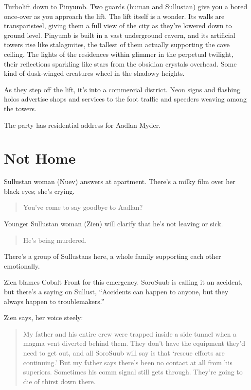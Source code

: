 \documentclass{book}
\begin{document}
\begin{multicols}{2}
Turbolift down to Pinyumb. Two guards (human and Sullustan) give you a bored once-over as you approach the lift. The lift itself is a wonder. Its walls are transparisteel, giving them a full view of the city as they’re lowered down to ground level. Pinyumb is built in a vast underground cavern, and its artificial towers rise like stalagmites, the tallest of them actually supporting the cave ceiling. The lights of the residences within glimmer in the perpetual twilight, their reflections sparkling like stars from the obsidian crystals overhead. Some kind of dusk-winged creatures wheel in the shadowy heights.

As they step off the lift, it’s into a commercial district. Neon signs and flashing holos advertise shops and services to the foot traffic and speeders weaving among the towers.

The party has residential address for Aadlan Myder.

\section{Not Home}

Sullustan woman (Nuev) answers at apartment. There’s a milky film over her black eyes; she’s crying.
\begin{quote}
You’ve come to say goodbye to Aadlan? 
\end{quote}

Younger Sullustan woman (Zien) will clarify that he’s not leaving or sick.
\begin{quote}
He’s being murdered.
\end{quote}

There’s a group of Sullustans here, a whole family supporting each other emotionally.

Zien blames Cobalt Front for this emergency. SoroSuub is calling it an accident, but there’s a saying on Sullust, “Accidents can happen to anyone, but they always happen to troublemakers.”

Zien says, her voice steely:
\begin{quote}
My father and his entire crew were trapped inside a side tunnel when a magma vent diverted behind them. They don’t have the equipment they’d need to get out, and all SoroSuub will say is that ‘rescue efforts are continuing.’ But my father says there’s been no contact at all from his superiors. Sometimes his comm signal still gets through. They’re going to die of thirst down there.
\end{quote}



\end{multicols}
\end{document}
